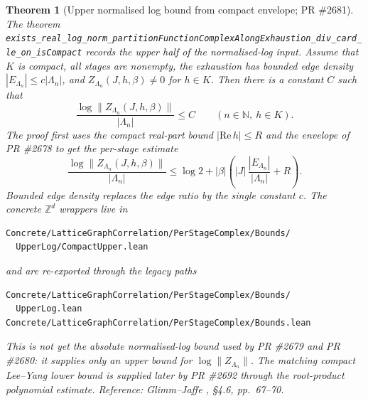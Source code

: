 \documentclass[a4paper,11pt]{article}
\newtheorem{theorem}{Theorem}
\begin{document}
\begin{theorem}[Upper normalised log bound from compact envelope; PR \#2681]
The theorem
\texttt{exists\_real\_log\_norm\_partitionFunctionComplexAlongExhaustion\_div\_card\_le\_on\_isCompact}
records the upper half of the normalised-log input.  Assume that $K$ is compact,
all stages are nonempty, the exhaustion has bounded edge density
$|E_{\Lambda_n}|\le c|\Lambda_n|$, and
$Z_{\Lambda_n}(J,h,\beta)\ne 0$ for $h\in K$.  Then there is a constant $C$
such that
\[
  \frac{\log\|Z_{\Lambda_n}(J,h,\beta)\|}{|\Lambda_n|}\le C
  \qquad(n\in\mathbb N,\ h\in K).
\]
The proof first uses the compact real-part bound $|\mathrm{Re}\,h|\le R$ and
the envelope of PR \#2678 to get the per-stage estimate
\[
  \frac{\log\|Z_{\Lambda_n}(J,h,\beta)\|}{|\Lambda_n|}
  \le
  \log 2+
  |\beta|\left(|J|\,\frac{|E_{\Lambda_n}|}{|\Lambda_n|}+R\right).
\]
Bounded edge density replaces the edge ratio by the single constant $c$.
The concrete $\mathbb Z^d$ wrappers live in
\begin{Verbatim}[fontsize=\footnotesize]
Concrete/LatticeGraphCorrelation/PerStageComplex/Bounds/
  UpperLog/CompactUpper.lean
\end{Verbatim}
and are re-exported through the legacy paths
\begin{Verbatim}[fontsize=\footnotesize]
Concrete/LatticeGraphCorrelation/PerStageComplex/Bounds/
  UpperLog.lean
Concrete/LatticeGraphCorrelation/PerStageComplex/Bounds.lean
\end{Verbatim}

This is not yet the absolute normalised-log bound used by PR \#2679 and
PR \#2680: it supplies only an upper bound for
$\log\|Z_{\Lambda_n}\|$.  The matching compact Lee--Yang lower bound is supplied
later by PR \#2692 through the root-product polynomial estimate.  Reference:
Glimm--Jaffe \cite{glimm-jaffe}, \S 4.6, pp.~67--70.
\end{theorem}
\end{document}
